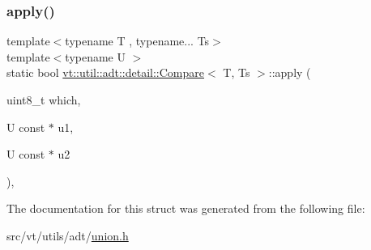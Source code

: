 \subsubsection{\texorpdfstring{apply()}{apply()}}
{\footnotesize\ttfamily template$<$typename T , typename... Ts$>$ \\
template$<$typename U $>$ \\
static bool \hyperlink{structvt_1_1util_1_1adt_1_1detail_1_1_compare}{vt\+::util\+::adt\+::detail\+::\+Compare}$<$ T, Ts $>$\+::apply (\begin{DoxyParamCaption}\item[{uint8\+\_\+t}]{which,  }\item[{U const $\ast$}]{u1,  }\item[{U const $\ast$}]{u2 }\end{DoxyParamCaption})\hspace{0.3cm}{\ttfamily [inline]}, {\ttfamily [static]}}



The documentation for this struct was generated from the following file\+:\begin{DoxyCompactItemize}
\item 
src/vt/utils/adt/\hyperlink{union_8h}{union.\+h}\end{DoxyCompactItemize}
